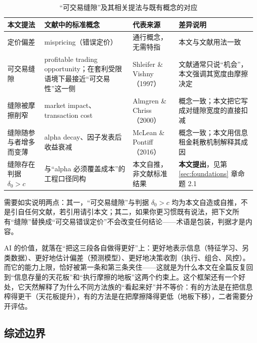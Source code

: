 \begin{table}[htbp]
\centering
\caption{“可交易缝隙”及其相关提法与既有概念的对应}
\label{tab:termalign}
\begin{tabular}{@{}>{\raggedright\arraybackslash}p{2.5cm}>{\raggedright\arraybackslash}p{4.3cm}>{\raggedright\arraybackslash}p{3.6cm}>{\raggedright\arraybackslash}p{3.8cm}@{}}
\toprule
本文提法 & 文献中的标准概念 & 代表来源 & 差异说明 \\
\midrule
定价偏差 & mispricing（错误定价） & 通行概念，无需特指 & 本文与文献用法一致 \\
可交易缝隙 & profitable trading opportunity；在套利受限语境下最接近“可交易性”这一侧 & Shleifer \& Vishny（1997）\cite{shleifer1997} & 文献通常只说“机会”，本文强调其宽度由摩擦决定 \\
缝隙被摩擦削窄 & market impact、transaction cost & Almgren \& Chriss（2000）\cite{almgrenchriss2000} & 概念一致；本文把它写成对缝隙宽度的直接扣减 \\
缝隙随参与者增多而变薄 & alpha decay、因子发表后收益衰减 & McLean \& Pontiff（2016）\cite{mcleanpontiff2016} & 概念一致；本文用信息租金耗散机制解释其成因 \\
缝隙存在判据 $\delta_0>c$ & 与“alpha 必须覆盖成本”的工程口径同构 & 本文自推，非文献标准结果 & \textbf{本文提出}，见第 \ref{sec:foundations} 章命题 2.1 \\
\bottomrule
\end{tabular}
\end{table}

\noindent 需要如实说明两点：其一，“可交易缝隙”与判据 $\delta_0>c$ 均为本文自造或自推，不是引自任何文献，若引用请引本文；其二，如果你更习惯既有说法，把下文所有“缝隙”替换成“可交易错误定价”不会改变任何结论——术语是包装，判据才是内容。

AI 的价值，就落在“把这三段各自做得更好”上：更好地表示信息（特征学习、另类数据）、更好地估计偏差（预测模型）、更好地决策收割（执行、组合、风控）。而它的能力上限，恰好被第一条和第三条夹住——这就是为什么本文在全篇反复回到“信息存量的天花板”和“执行摩擦的地板”这两个约束上。这个框架还有一个好处，它天然解释了为什么不同方法族的“看起来好”并不等价：有的方法是在把信息榨得更干（天花板提升），有的方法是在把摩擦降得更低（地板下移），二者需要分开评估。

\subsection{综述边界}

